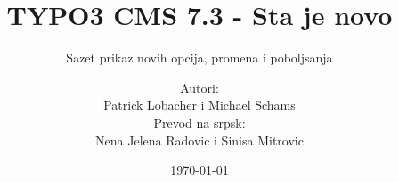 %
%
%

\documentclass[t]{beamer}

\beamertemplatenavigationsymbolsempty

{
	\usetheme{typo3slides}
}

\title{TYPO3 CMS 7.3 - Sta je novo}
\subtitle{Sazet prikaz novih opcija, promena i poboljsanja}
\author{
	\centerline{Autori:}
	\centerline{Patrick Lobacher i Michael Schams}
	\centerline{Prevod na srpsk:}
	\centerline{Nena Jelena Radovic i Sinisa Mitrovic}
}

\date{\today}



\sharefont


\begingroup
	[default]
	\begin{frame}
		\titlepage
	\end{frame}
\endgroup


\section*{TYPO3 CMS 7.3 - Sta je novo}
\begin{frame}[fragile]
	\frametitle{Sadrzaj}
	\framesubtitle{Sadrzaj}

	\begin{multicols}{2}
		\tableofcontents
	\end{multicols}

\end{frame}

